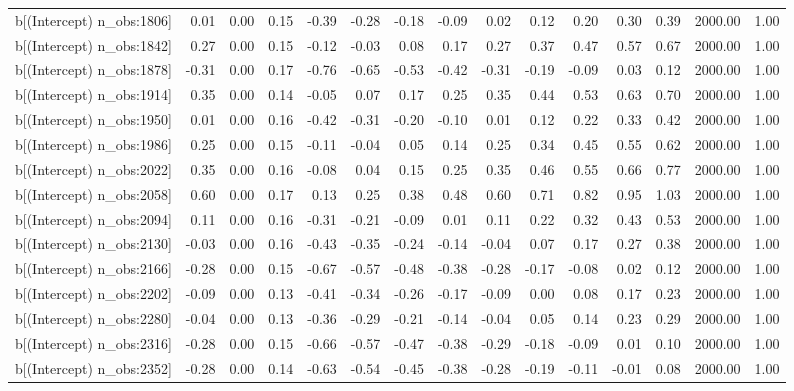 \begin{table}[ht]
\begin{tabular}{rrrrrrrrrrrrrrr}
  b[(Intercept) n\_obs:1806] & 0.01 & 0.00 & 0.15 & -0.39 & -0.28 & -0.18 & -0.09 & 0.02 & 0.12 & 0.20 & 0.30 & 0.39 & 2000.00 & 1.00 \\ 
  b[(Intercept) n\_obs:1842] & 0.27 & 0.00 & 0.15 & -0.12 & -0.03 & 0.08 & 0.17 & 0.27 & 0.37 & 0.47 & 0.57 & 0.67 & 2000.00 & 1.00 \\ 
  b[(Intercept) n\_obs:1878] & -0.31 & 0.00 & 0.17 & -0.76 & -0.65 & -0.53 & -0.42 & -0.31 & -0.19 & -0.09 & 0.03 & 0.12 & 2000.00 & 1.00 \\ 
  b[(Intercept) n\_obs:1914] & 0.35 & 0.00 & 0.14 & -0.05 & 0.07 & 0.17 & 0.25 & 0.35 & 0.44 & 0.53 & 0.63 & 0.70 & 2000.00 & 1.00 \\ 
  b[(Intercept) n\_obs:1950] & 0.01 & 0.00 & 0.16 & -0.42 & -0.31 & -0.20 & -0.10 & 0.01 & 0.12 & 0.22 & 0.33 & 0.42 & 2000.00 & 1.00 \\ 
  b[(Intercept) n\_obs:1986] & 0.25 & 0.00 & 0.15 & -0.11 & -0.04 & 0.05 & 0.14 & 0.25 & 0.34 & 0.45 & 0.55 & 0.62 & 2000.00 & 1.00 \\ 
  b[(Intercept) n\_obs:2022] & 0.35 & 0.00 & 0.16 & -0.08 & 0.04 & 0.15 & 0.25 & 0.35 & 0.46 & 0.55 & 0.66 & 0.77 & 2000.00 & 1.00 \\ 
  b[(Intercept) n\_obs:2058] & 0.60 & 0.00 & 0.17 & 0.13 & 0.25 & 0.38 & 0.48 & 0.60 & 0.71 & 0.82 & 0.95 & 1.03 & 2000.00 & 1.00 \\ 
  b[(Intercept) n\_obs:2094] & 0.11 & 0.00 & 0.16 & -0.31 & -0.21 & -0.09 & 0.01 & 0.11 & 0.22 & 0.32 & 0.43 & 0.53 & 2000.00 & 1.00 \\ 
  b[(Intercept) n\_obs:2130] & -0.03 & 0.00 & 0.16 & -0.43 & -0.35 & -0.24 & -0.14 & -0.04 & 0.07 & 0.17 & 0.27 & 0.38 & 2000.00 & 1.00 \\ 
  b[(Intercept) n\_obs:2166] & -0.28 & 0.00 & 0.15 & -0.67 & -0.57 & -0.48 & -0.38 & -0.28 & -0.17 & -0.08 & 0.02 & 0.12 & 2000.00 & 1.00 \\ 
  b[(Intercept) n\_obs:2202] & -0.09 & 0.00 & 0.13 & -0.41 & -0.34 & -0.26 & -0.17 & -0.09 & 0.00 & 0.08 & 0.17 & 0.23 & 2000.00 & 1.00 \\ 
  b[(Intercept) n\_obs:2280] & -0.04 & 0.00 & 0.13 & -0.36 & -0.29 & -0.21 & -0.14 & -0.04 & 0.05 & 0.14 & 0.23 & 0.29 & 2000.00 & 1.00 \\ 
  b[(Intercept) n\_obs:2316] & -0.28 & 0.00 & 0.15 & -0.66 & -0.57 & -0.47 & -0.38 & -0.29 & -0.18 & -0.09 & 0.01 & 0.10 & 2000.00 & 1.00 \\ 
  b[(Intercept) n\_obs:2352] & -0.28 & 0.00 & 0.14 & -0.63 & -0.54 & -0.45 & -0.38 & -0.28 & -0.19 & -0.11 & -0.01 & 0.08 & 2000.00 & 1.00 \\ 

\end{tabular}
\end{table}
